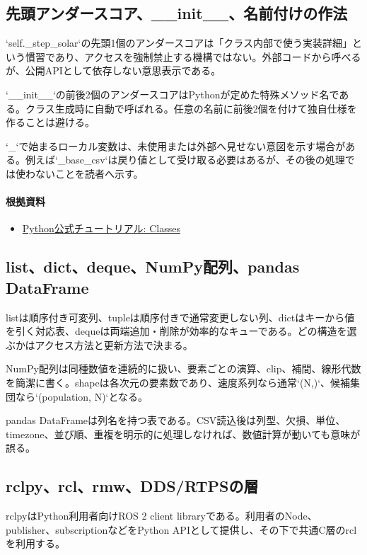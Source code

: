 \documentclass[a4paper,11pt]{article}
\begin{document}
\subsection{先頭アンダースコア、\_\_init\_\_、名前付けの作法}
`self.\_step\_solar`の先頭1個のアンダースコアは「クラス内部で使う実装詳細」という慣習であり、アクセスを強制禁止する機構ではない。外部コードから呼べるが、公開APIとして依存しない意思表示である。


`\_\_init\_\_`の前後2個のアンダースコアはPythonが定めた特殊メソッド名である。クラス生成時に自動で呼ばれる。任意の名前に前後2個を付けて独自仕様を作ることは避ける。


`\_`で始まるローカル変数は、未使用または外部へ見せない意図を示す場合がある。例えば`\_base\_csv`は戻り値として受け取る必要はあるが、その後の処理では使わないことを読者へ示す。

\paragraph{根拠資料}
\begin{itemize}[leftmargin=1.6em]
\item \href{https://docs.python.org/3/tutorial/classes.html}{Python公式チュートリアル: Classes}
\end{itemize}

\subsection{list、dict、deque、NumPy配列、pandas DataFrame}
listは順序付き可変列、tupleは順序付きで通常変更しない列、dictはキーから値を引く対応表、dequeは両端追加・削除が効率的なキューである。どの構造を選ぶかはアクセス方法と更新方法で決まる。


NumPy配列は同種数値を連続的に扱い、要素ごとの演算、clip、補間、線形代数を簡潔に書く。shapeは各次元の要素数であり、速度系列なら通常`(N,)`、候補集団なら`(population, N)`となる。


pandas DataFrameは列名を持つ表である。CSV読込後は列型、欠損、単位、timezone、並び順、重複を明示的に処理しなければ、数値計算が動いても意味が誤る。



\subsection{rclpy、rcl、rmw、DDS/RTPSの層}
rclpyはPython利用者向けROS 2 client libraryである。利用者のNode、publisher、subscriptionなどをPython APIとして提供し、その下で共通C層のrclを利用する。
\end{document}
